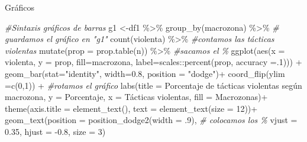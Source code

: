\documentclass[
  8pt,
  ignorenonframetext,
]{beamer}
\newenvironment{Shaded}{\begin{snugshade}}{\end{snugshade}}
\newcommand{\AttributeTok}[1]{\textcolor[rgb]{0.77,0.63,0.00}{#1}}
\newcommand{\CommentTok}[1]{\textcolor[rgb]{0.56,0.35,0.01}{\textit{#1}}}
\newcommand{\DecValTok}[1]{\textcolor[rgb]{0.00,0.00,0.81}{#1}}
\newcommand{\FloatTok}[1]{\textcolor[rgb]{0.00,0.00,0.81}{#1}}
\newcommand{\FunctionTok}[1]{\textcolor[rgb]{0.00,0.00,0.00}{#1}}
\newcommand{\NormalTok}[1]{#1}
\newcommand{\OtherTok}[1]{\textcolor[rgb]{0.56,0.35,0.01}{#1}}
\newcommand{\SpecialCharTok}[1]{\textcolor[rgb]{0.00,0.00,0.00}{#1}}
\newcommand{\StringTok}[1]{\textcolor[rgb]{0.31,0.60,0.02}{#1}}
\begin{document}
\begin{frame}[fragile]{Gráficos}
\protect\hypertarget{gruxe1ficos-5}{}
\begin{Shaded}
\begin{Highlighting}[]
\CommentTok{\#Sintaxis gráficos de barras}
\NormalTok{g1 }\OtherTok{\textless{}{-}}\NormalTok{df1 }\SpecialCharTok{\%\textgreater{}\%} \FunctionTok{group\_by}\NormalTok{(macrozona) }\SpecialCharTok{\%\textgreater{}\%} \CommentTok{\# guardamos el gráfico en "g1"}
  \FunctionTok{count}\NormalTok{(violenta) }\SpecialCharTok{\%\textgreater{}\%}  \CommentTok{\#contamos las tácticas violentas}
  \FunctionTok{mutate}\NormalTok{(}\AttributeTok{prop =} \FunctionTok{prop.table}\NormalTok{(n)) }\SpecialCharTok{\%\textgreater{}\%}  \CommentTok{\#sacamos el \%}
  \FunctionTok{ggplot}\NormalTok{(}\FunctionTok{aes}\NormalTok{(}\AttributeTok{x =}\NormalTok{ violenta, }\AttributeTok{y =}\NormalTok{ prop,}
             \AttributeTok{fill=}\NormalTok{macrozona, }\AttributeTok{label=}\NormalTok{scales}\SpecialCharTok{::}\FunctionTok{percent}\NormalTok{(prop, }\AttributeTok{accuracy =}\NormalTok{.}\DecValTok{1}\NormalTok{))) }\SpecialCharTok{+}
  \FunctionTok{geom\_bar}\NormalTok{(}\AttributeTok{stat=}\StringTok{"identity"}\NormalTok{, }\AttributeTok{width=}\FloatTok{0.8}\NormalTok{, }\AttributeTok{position =} \StringTok{"dodge"}\NormalTok{)}\SpecialCharTok{+}  
  \FunctionTok{coord\_flip}\NormalTok{(}\AttributeTok{ylim =}\FunctionTok{c}\NormalTok{(}\DecValTok{0}\NormalTok{,}\DecValTok{1}\NormalTok{)) }\SpecialCharTok{+} \CommentTok{\#rotamos el gráfico}
  \FunctionTok{labs}\NormalTok{(}\AttributeTok{title =} \StringTok{\textquotesingle{}Porcentaje de tácticas violentas según macrozona\textquotesingle{}}\NormalTok{, }
       \AttributeTok{y =} \StringTok{\textquotesingle{}Porcentaje\textquotesingle{}}\NormalTok{, }
       \AttributeTok{x =} \StringTok{\textquotesingle{}Tácticas violentas\textquotesingle{}}\NormalTok{,}
       \AttributeTok{fill =} \StringTok{\textquotesingle{}Macrozonas\textquotesingle{}}\NormalTok{)}\SpecialCharTok{+} 
  \FunctionTok{theme}\NormalTok{(}\AttributeTok{axis.title =} \FunctionTok{element\_text}\NormalTok{(), }\AttributeTok{text =} \FunctionTok{element\_text}\NormalTok{(}\AttributeTok{size =} \DecValTok{12}\NormalTok{))}\SpecialCharTok{+}
   \FunctionTok{geom\_text}\NormalTok{(}\AttributeTok{position =} \FunctionTok{position\_dodge2}\NormalTok{(}\AttributeTok{width =}\NormalTok{ .}\DecValTok{9}\NormalTok{), }\CommentTok{\# colocamos los \%     }
              \AttributeTok{vjust =} \FloatTok{0.35}\NormalTok{,}
              \AttributeTok{hjust =} \SpecialCharTok{{-}}\FloatTok{0.8}\NormalTok{,}
              \AttributeTok{size =} \DecValTok{3}\NormalTok{)}
\end{Highlighting}
\end{Shaded}
\end{frame}
\end{document}
